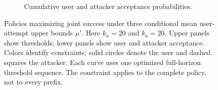 \begin{figure}[t]
\begin{subfigure}{\columnwidth}
\caption{Cumulative user and attacker acceptance probabilities.}
\end{subfigure}
\par\medskip
\caption{Policies maximizing joint success under three conditional mean user-attempt upper bounds $\mu'$. Here $k_u=20$ and $k_a=20$.
Upper panels show thresholds; lower panels show user and attacker acceptance.
Colors identify constraints; solid circles denote the user and dashed squares the attacker.
Each curve uses one optimized full-horizon threshold sequence.
The constraint applies to the complete policy, not to every prefix.}
\label{fig:livdet_mean_limits_comparison}
\end{figure}
